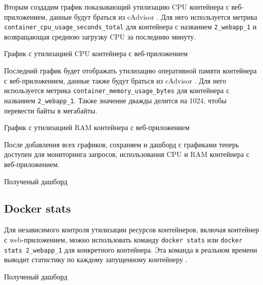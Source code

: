Вторым создадим график показывающий утилизацию CPU контейнера
с веб-приложением, данные будут браться из cAdvisor .
Для него используется метрика \verb|container_cpu_usage_seconds_total| 
для контейнера с названием \verb|2_webapp_1|
и возвращающая среднюю загрузку CPU за последнию минуту.

\begin{image}
    \caption{График с утилизацией CPU контейнера с веб-приложением}
    \label{fig:graph:cpu}
\end{image}

Последний график будет отображать утилизацию оперативной памяти контейнера
с веб-приложением, данные также будут браться из cAdvisor .
Для него используется метрика \verb|container_memory_usage_bytes| 
для контейнера с названием \verb|2_webapp_1|.
Также значение дважды делится на 1024, чтобы перевести байты в мегабайты.

\begin{image}
    \caption{График с утилизацией RAM контейнера с веб-приложением}
    \label{fig:graph:ram}
\end{image}

После добавления всех графиков,
сохраняем и дашборд с графиками теперь доступен для мониторинга запросов,
использования CPU и RAM контейнера с веб-приложением.

\begin{image}
    \caption{Полученый дашборд}
    \label{fig:dashboard}
\end{image}

\subsection{Docker stats}

Для независимого контроля утилизации ресурсов контейнеров,
включая контейнер с web-приложением, можно использовать команду
\texttt{docker stats} или \texttt{docker stats 2\_webapp\_1}
для конкретного контейнера.
Эта команда в реальном времени выводит статистику
по каждому запущенному контейнеру .

\begin{image}
    \caption{Полученый дашборд}
    \label{fig:docker:stats}
\end{image}

